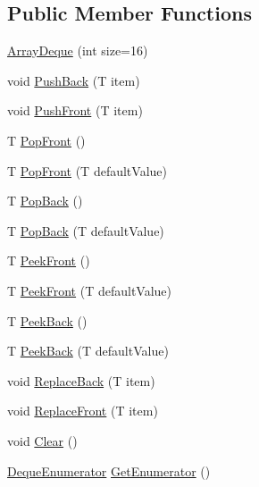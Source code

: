 \subsection*{Public Member Functions}
\begin{DoxyCompactItemize}
\item 
\hyperlink{class_o_t_a_1_1_misc_1_1_array_deque_aba098780f8e071c8187dd824e2c118fc}{Array\+Deque} (int size=16)
\item 
void \hyperlink{class_o_t_a_1_1_misc_1_1_array_deque_ab43a707569d95e85d842749cd474d36f}{Push\+Back} (T item)
\item 
void \hyperlink{class_o_t_a_1_1_misc_1_1_array_deque_a765dfa71af394bcab8326ca4c94a9f1b}{Push\+Front} (T item)
\item 
T \hyperlink{class_o_t_a_1_1_misc_1_1_array_deque_a2eeb36f287f1f4fb846c35b31265d171}{Pop\+Front} ()
\item 
T \hyperlink{class_o_t_a_1_1_misc_1_1_array_deque_aa39823826b60fd010f9d8652c54c6da2}{Pop\+Front} (T default\+Value)
\item 
T \hyperlink{class_o_t_a_1_1_misc_1_1_array_deque_a73aaa14d5de79f317265e7d3f7ac6e9a}{Pop\+Back} ()
\item 
T \hyperlink{class_o_t_a_1_1_misc_1_1_array_deque_ae14ace874073500ae4abecce48ca056d}{Pop\+Back} (T default\+Value)
\item 
T \hyperlink{class_o_t_a_1_1_misc_1_1_array_deque_a2eb719b2ccfa6ab8def6a0018b4c1390}{Peek\+Front} ()
\item 
T \hyperlink{class_o_t_a_1_1_misc_1_1_array_deque_a5709711512388ddc7fb8bedbef8fe74f}{Peek\+Front} (T default\+Value)
\item 
T \hyperlink{class_o_t_a_1_1_misc_1_1_array_deque_a383b9479150ffb7fabbe729ae1a04f8f}{Peek\+Back} ()
\item 
T \hyperlink{class_o_t_a_1_1_misc_1_1_array_deque_af2edf32cd0e6f588fefd42594140f3f9}{Peek\+Back} (T default\+Value)
\item 
void \hyperlink{class_o_t_a_1_1_misc_1_1_array_deque_a85e4a40c61755f237e2d8e5f423f6c67}{Replace\+Back} (T item)
\item 
void \hyperlink{class_o_t_a_1_1_misc_1_1_array_deque_afe82d518060cc8a69dd1af86cea1e48e}{Replace\+Front} (T item)
\item 
void \hyperlink{class_o_t_a_1_1_misc_1_1_array_deque_a81676cc40564994da6cf5c6325556c65}{Clear} ()
\item 
\hyperlink{struct_o_t_a_1_1_misc_1_1_array_deque_1_1_deque_enumerator}{Deque\+Enumerator} \hyperlink{class_o_t_a_1_1_misc_1_1_array_deque_af8b47a17bbe144b4fd5f415cba151885}{Get\+Enumerator} ()
\end{DoxyCompactItemize}
